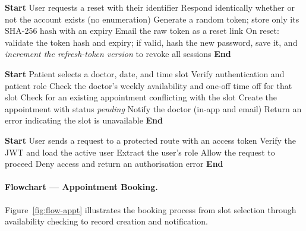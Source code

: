 \documentclass[12pt,a4paper]{report}
\begin{document}
\begin{algorithm}[htbp]
\caption{Password Reset}
\begin{algorithmic}[1]
\State \textbf{Start}
\State User requests a reset with their identifier
\State Respond identically whether or not the account exists (no enumeration)
  \State Generate a random token; store only its SHA-256 hash with an expiry
  \State Email the raw token as a reset link
\EndIf
\State On reset: validate the token hash and expiry; if valid, hash the new password,
       save it, and \emph{increment the refresh-token version} to revoke all sessions
\State \textbf{End}
\end{algorithmic}
\end{algorithm}

\begin{algorithm}[htbp]
\caption{Appointment Booking}
\begin{algorithmic}[1]
\State \textbf{Start}
\State Patient selects a doctor, date, and time slot
\State Verify authentication and patient role
\State Check the doctor's weekly availability and one-off time off for that slot
\State Check for an existing appointment conflicting with the slot
  \State Create the appointment with status \emph{pending}
  \State Notify the doctor (in-app and email)
\Else
  \State Return an error indicating the slot is unavailable
\EndIf
\State \textbf{End}
\end{algorithmic}
\end{algorithm}

\begin{algorithm}[htbp]
\caption{Role-Based Access Control}
\begin{algorithmic}[1]
\State \textbf{Start}
\State User sends a request to a protected route with an access token
\State Verify the JWT and load the active user
\State Extract the user's role
  \State Allow the request to proceed
\Else
  \State Deny access and return an authorisation error
\EndIf
\State \textbf{End}
\end{algorithmic}
\end{algorithm}

\paragraph{Flowchart --- Appointment Booking.}
Figure~\ref{fig:flow-appt} illustrates the booking process from slot selection through
availability checking to record creation and notification.
\end{document}
